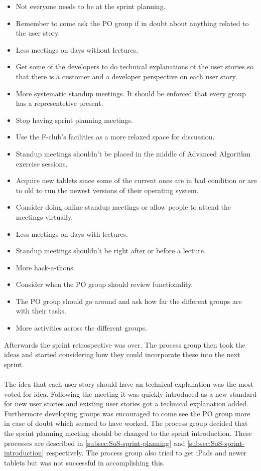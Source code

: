 \begin{itemize}
    \item Not everyone needs to be at the sprint planning.
    \item Remember to come ask the PO group if in doubt about anything related to the user story.
    \item Less meetings on days without lectures.
    \item Get some of the developers to do technical explanations of the user stories so that there is a customer and a developer perspective on each user story.
    \item More systematic standup meetings. It should be enforced that every group has a representetive present.
    \item Stop having sprint planning meetings.
    \item Use the F-club's facilities as a more relaxed space for discussion. 
    \item Standup meetings shouldn't be placed in the middle of Advanced Algorithm exercise sessions.
    \item Acquire new tablets since some of the current ones are in bad condition or are to old to run the newest versions of their operating system.
    \item Consider doing online standup meetings or allow people to attend the meetings virtually.
    \item Less meetings on days with lectures.
    \item Standup meetings shouldn't be right after or before a lecture.
    \item More hack-a-thons.
    \item Consider when the PO group should review functionality. 
    \item The PO group should go around and ask how far the different groups are with their tasks.
    \item More activities across the different groups.
\end{itemize}
Afterwards the sprint retrospective was over.
The process group then took the ideas and started considering how they could incorporate these into the next sprint.
\\\\
The idea that each user story should have an technical explanation was the most voted for idea. 
Following the meeting it was quickly introduced as a new standard for new user stories and existing user stories got a technical explanation added.
Furthermore developing groups was encouraged to come see the PO group more in case of doubt which seemed to have worked.
The process group decided that the sprint planning meeting should be changed to the sprint introduction.
These processes are described in \ref{subsec:SoS-sprint-planning} and \ref{subsec:SoS-sprint-introduction} respectively.
The process group also tried to get iPads and newer tablets but was not successful in accomplishing this.
